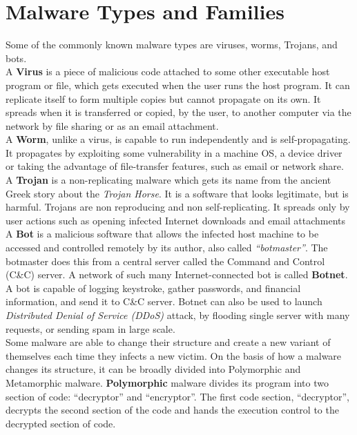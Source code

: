 \section{Malware Types and Families}
\label{sec:Malware Types and Families}
Some of the commonly known malware types are viruses, worms, Trojans, and bots.\\
A \textbf{Virus} is a piece of malicious code attached to some other executable host program or file, which gets executed when the user runs the host program.
It can replicate itself to form multiple copies but cannot propagate on its own.
It spreads when it is transferred or copied, by the user, to another computer via the network by file sharing or as an email attachment.\\
A \textbf{Worm}, unlike a virus, is capable to run independently and is self-propagating.
It propagates by exploiting some vulnerability in a machine OS, a device driver or taking the advantage of file-transfer features, such as email or network share.\\
A \textbf{Trojan} is a non-replicating malware which gets its name from the ancient Greek story about the \textit{Trojan Horse}.
It is a software that looks legitimate, but is harmful.
Trojans are non reproducing and non self-replicating.
It spreads only by user actions such as opening infected Internet downloads and email attachments~\cite[]{ciscodif} \\
A \textbf{Bot} is a malicious software that allows the infected host machine to be accessed and controlled remotely by its author, also called \emph{``botmaster''}.
The botmaster does this from a central server called the Command and Control (C\&C) server.
A network of such many Internet-connected bot is called \textbf{Botnet}.
A bot is capable of logging keystroke, gather passwords, and financial information, and send it to C\&C server.
Botnet can also be used to launch \emph{Distributed Denial of Service (DDoS)} attack, by flooding single server with many requests, or sending spam in large scale.\\
Some malware are able to change their structure and create a new variant of themselves each time they infects a new victim.
On the basis of how a malware changes its structure, it can be broadly divided into Polymorphic and Metamorphic malware.
\textbf{Polymorphic} malware divides its program into two section of code: ``decryptor'' and ``encryptor''.
The first code section, ``decryptor'', decrypts the second section of the code and hands the execution control to the decrypted section of code.
